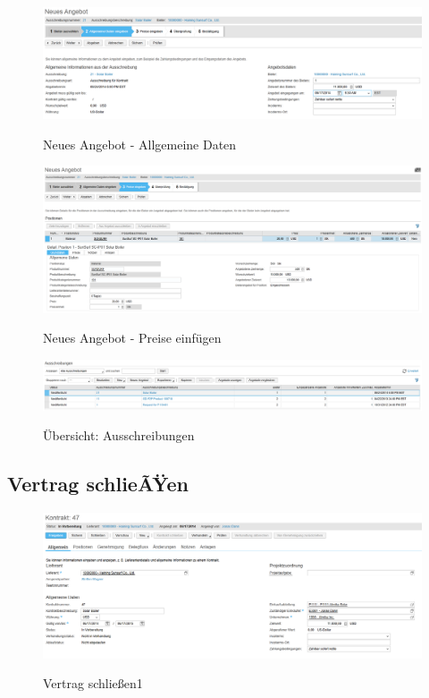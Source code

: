 \begin{figure}[H]
	\begin{center}
	\includegraphics[width=1.0\textwidth]{grafiken/ByDesign-HowTo-Ausschreibung-4.png}
	\caption{Neues Angebot - Allgemeine Daten}
	\vspace{-10pt}
	\label{abb:byd-newsupplier}
	\end{center}
\end{figure}
\begin{figure}[H]
	\begin{center}
	\includegraphics[width=1.0\textwidth]{grafiken/ByDesign-HowTo-Ausschreibung-5.png}
	\caption{Neues Angebot - Preise einfügen}
	\vspace{-10pt}
	\label{abb:byd-newsupplier}
	\end{center}
\end{figure}
\begin{figure}[H]
	\begin{center}
	\includegraphics[width=1.0\textwidth]{grafiken/ByDesign-HowTo-Ausschreibung-6.png}
	\caption{Übersicht: Ausschreibungen}
	\vspace{-10pt}
	\label{abb:byd-newsupplier}
	\end{center}
\end{figure}

\subsection{Vertrag schlieÃŸen}
\label{contract}

\begin{figure}[H]
	\begin{center}
	\includegraphics[width=1.0\textwidth]{grafiken/ByDesign-HowTo-4.png}
	\caption{Vertrag schließen1}
	\vspace{-10pt}
	\label{abb:byd-newsupplier}
	\end{center}
\end{figure}